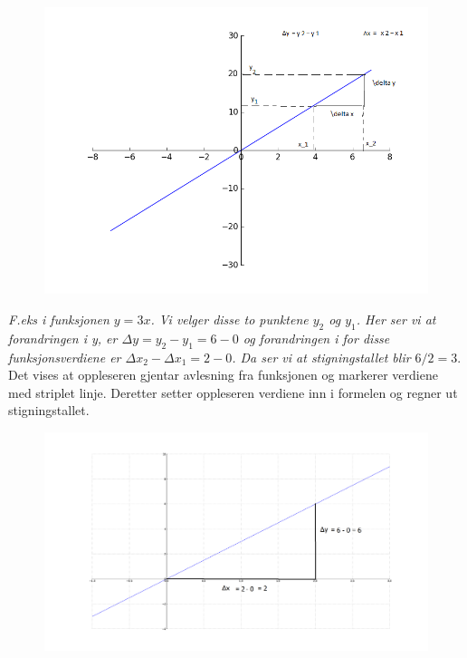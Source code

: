 \documentclass[12pt,twoside,onecolumn]{article}
\begin{document}
\begin{Exercise}
\begin{figure}[h!]
\includegraphics[scale = 0.6]{figures/stigningstallet.png}
\end{figure}
\newline\newline
{\emph{\color{gray}
F.eks i funksjonen $y = 3x$. Vi velger disse to punktene $y_2$ og $y_1$. Her ser vi at forandringen i y, er $\Delta y = y_2 - y_1 = 6- 0$ og forandringen i for disse funksjonsverdiene er $\Delta x_2 - \Delta x_1 = 2 - 0$. Da ser vi at stigningstallet blir $6/2 = 3.$}} \newline
{\color{PineGreen} Det vises at oppleseren gjentar avlesning fra funksjonen og markerer verdiene med striplet linje. Deretter setter oppleseren verdiene inn i formelen og regner ut stigningstallet.}
\begin{figure}[h!]
\centering
\includegraphics[scale = 0.3]{figures/stigningstalleksempelet.png}
\end{figure}
\end{Exercise}
\end{document}
